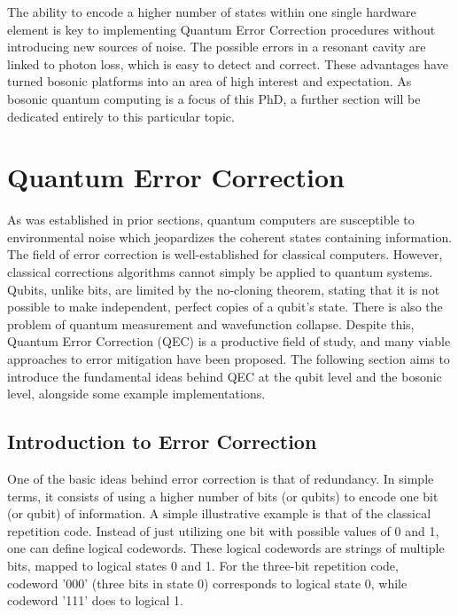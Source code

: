 The ability to encode a higher number of states within one single hardware element is key to implementing Quantum Error Correction procedures without introducing new sources of noise. The possible errors in a resonant cavity are linked to photon loss, which is easy to detect and correct. These advantages have turned bosonic platforms into an area of high interest and expectation. As bosonic quantum computing is a focus of this PhD, a further section will be dedicated entirely to this particular topic.

\clearpage
\chapter{Quantum Error Correction}

As was established in prior sections, quantum computers are susceptible to environmental noise which jeopardizes the coherent states containing information. The field of error correction is well-established for classical computers. However, classical corrections algorithms cannot simply be applied to quantum systems. Qubits, unlike bits, are limited by the no-cloning theorem, stating that it is not possible to make independent, perfect copies of a qubit's state. There is also the problem of quantum measurement and wavefunction collapse. Despite this, Quantum Error Correction (QEC) is a productive field of study, and many viable approaches to error mitigation have been proposed. The following section aims to introduce the fundamental ideas behind QEC at the qubit level and the bosonic level, alongside some example implementations.

\section{Introduction to Error Correction}

One of the basic ideas behind error correction is that of redundancy\cite{Girvin2021,Gottesman2009,Devitt2013,Roffe2019}. In simple terms, it consists of using a higher number of bits (or qubits) to encode one bit (or qubit) of information. A simple illustrative example is that of the classical repetition code. Instead of just utilizing one bit with possible values of 0 and 1, one can define logical codewords. These logical codewords are strings of multiple bits, mapped to logical states 0 and 1. For the three-bit repetition code, codeword '000' (three bits in state 0) corresponds to logical state 0, while codeword '111' does to logical 1. 

